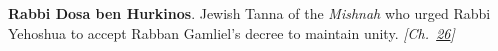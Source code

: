 \textbf{Rabbi Dosa ben Hurkinos}. Jewish Tanna of the \emph{Mishnah} who urged Rabbi Yehoshua to accept Rabban Gamliel's decree to maintain unity. \emph{[Ch.~\hyperref[ch:jewishcalendar]{26}]}

